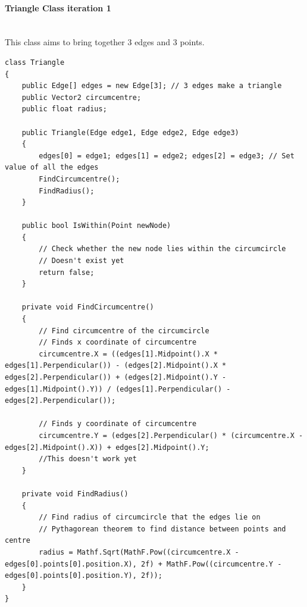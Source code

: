 \documentclass{article}
\newcommand{\myparagraph}[1]{\paragraph{#1}\mbox{}\\} %
\begin{document}
\myparagraph{Triangle Class iteration 1}
This class aims to bring together 3 edges and 3 points.
\begin{lstlisting}
class Triangle
{
    public Edge[] edges = new Edge[3]; // 3 edges make a triangle
    public Vector2 circumcentre;
    public float radius;

    public Triangle(Edge edge1, Edge edge2, Edge edge3)
    {
        edges[0] = edge1; edges[1] = edge2; edges[2] = edge3; // Set value of all the edges
        FindCircumcentre();
        FindRadius();
    }

    public bool IsWithin(Point newNode)
    {
        // Check whether the new node lies within the circumcircle
        // Doesn't exist yet
        return false;
    }

    private void FindCircumcentre()
    {
        // Find circumcentre of the circumcircle
        // Finds x coordinate of circumcentre
        circumcentre.X = ((edges[1].Midpoint().X * edges[1].Perpendicular()) - (edges[2].Midpoint().X * edges[2].Perpendicular()) + (edges[2].Midpoint().Y - edges[1].Midpoint().Y)) / (edges[1].Perpendicular() - edges[2].Perpendicular());

        // Finds y coordinate of circumcentre
        circumcentre.Y = (edges[2].Perpendicular() * (circumcentre.X - edges[2].Midpoint().X)) + edges[2].Midpoint().Y;
        //This doesn't work yet
    }

    private void FindRadius()
    {
        // Find radius of circumcircle that the edges lie on
        // Pythagorean theorem to find distance between points and centre
        radius = Mathf.Sqrt(MathF.Pow((circumcentre.X - edges[0].points[0].position.X), 2f) + MathF.Pow((circumcentre.Y - edges[0].points[0].position.Y), 2f));
    }
}

\end{lstlisting}
\end{document}

